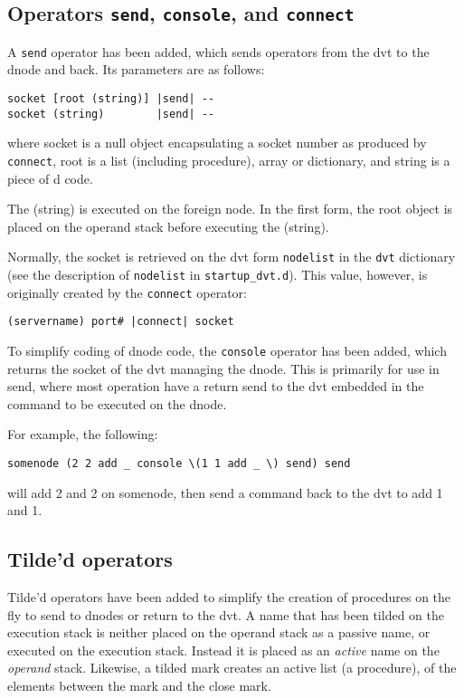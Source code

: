 \documentclass[12pt]{article}
\begin{document}
\subsection{Operators \texttt{send}, \texttt{console}, and \texttt{connect}}
\label{sec:send}

A \verb$send$ operator has been added, which sends operators from the
dvt to the dnode and back. Its parameters are as follows:
\begin{verbatim}
socket [root (string)] |send| --
socket (string)        |send| --
\end{verbatim}
where socket is a null object encapsulating a socket number as
produced by \verb$connect$, root is a list (including procedure),
array or dictionary, and string is a piece of d code.

The (string) is executed on the foreign node. In the first form, the
root object is placed on the operand stack before executing the
(string).

Normally, the socket is retrieved on the dvt form \verb$nodelist$ in
the \verb$dvt$ dictionary (see the description of \verb$nodelist$ in
\texttt{startup\_dvt.d}). This value, however, is originally created
by the \verb$connect$ operator:
\begin{verbatim}
(servername) port# |connect| socket
\end{verbatim}

To simplify coding of dnode code, the \verb$console$ operator has been
added, which returns the socket of the dvt managing the dnode. This is
primarily for use in send, where most operation have a return send to
the dvt embedded in the command to be executed on the dnode.

For example, the following:
\begin{verbatim}
somenode (2 2 add _ console \(1 1 add _ \) send) send
\end{verbatim}
will add 2 and 2 on somenode, then send a command back to the
dvt to add 1 and 1.

\subsection{Tilde'd operators}
\label{sec:tilde}

Tilde'd operators have been added to simplify the creation of
procedures on the fly to send to dnodes or return to the dvt. A
name that has been tilded on the execution stack is neither placed on
the operand stack as a passive name, or executed on the execution
stack. Instead it is placed as an \emph{active} name on the
\emph{operand} stack. Likewise, a tilded mark creates an active list
(a procedure), of the elements between the mark and the close mark.
\end{document}

